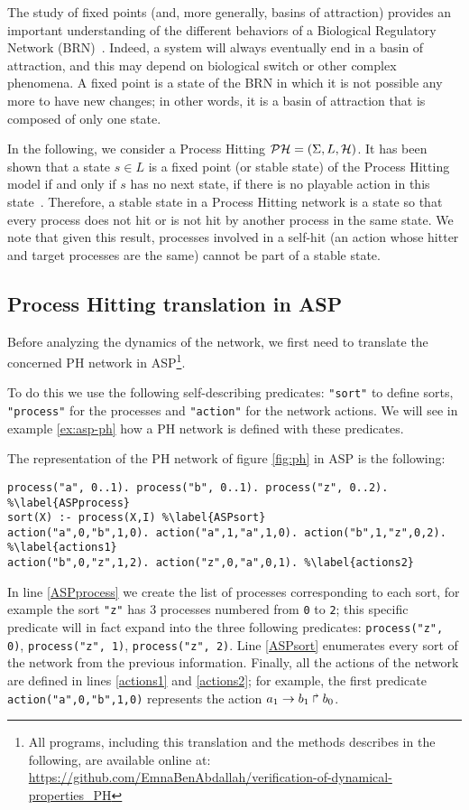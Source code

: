 The study of fixed points (and, more generally, basins of attraction) provides an important understanding of the different behaviors of a Biological Regulatory Network (BRN)~\cite{wuensche1998genomic}.
Indeed, a system will always eventually end in a basin of attraction,
and this may depend on biological switch or other complex phenomena.
A fixed point is a state of the BRN in which it is not possible any more to have new changes;
in other words, it is a basin of attraction that is composed of only one state.

In the following, we consider a Process Hitting $\mathcal{PH} = (\Sigma, L, \mathcal{H})$.
It has been shown that a state $s \in L$ is a fixed point (or stable state) of the Process Hitting model if and only if $s$ has no next state, \ie if there is no playable action in this state~\cite{PMR10-TCSB}.
Therefore, a stable state in a Process Hitting network is a state so that
every process does not hit or is not hit by another process in the same state.
We note that given this result, processes involved in a self-hit (an action whose hitter and target processes are the same) cannot be part of a stable state.

\subsection{Process Hitting translation in ASP}
Before analyzing the dynamics of the network,
we first need to translate the concerned PH network in ASP\footnote{All programs, including this translation and the methods describes in the following, are available online at: \url{https://github.com/EmnaBenAbdallah/verification-of-dynamical-properties_PH}}.

To do this we use the following self-describing predicates:
\texttt{"sort"} to define sorts, \texttt{"process"} for the processes and \texttt{"action"} for the network actions. We will see in example \ref{ex:asp-ph} how a PH network is defined with these predicates.

\begin{example}
\label{ex:asp-ph}
The representation of the PH network of figure \ref{fig:ph} in ASP is the following:
\begin{lstlisting}
process("a", 0..1). process("b", 0..1). process("z", 0..2). %\label{ASPprocess}
sort(X) :- process(X,I) %\label{ASPsort}
action("a",0,"b",1,0). action("a",1,"a",1,0). action("b",1,"z",0,2). %\label{actions1}
action("b",0,"z",1,2). action("z",0,"a",0,1). %\label{actions2}
\end{lstlisting}
In line \ref{ASPprocess} we create the list of processes corresponding to each sort,
for example the sort \texttt{"z"} has 3 processes numbered from \texttt{0} to \texttt{2};
this specific predicate will in fact expand into the three following predicates:
\texttt{process("z", 0)}, \texttt{process("z", 1)}, \texttt{process("z", 2)}.
Line \ref{ASPsort} enumerates every sort of the network from the previous information.
Finally, all the actions of the network are defined in lines \ref{actions1} and \ref{actions2};
for example, the first predicate \texttt{action("a",0,"b",1,0)} represents the action
$a_1\rightarrow b_1\Rsh b_0$.
\end{example}

